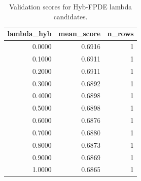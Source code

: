\begin{table}[t]
\caption{Validation scores for Hyb-FPDE lambda candidates.}
\label{tab:lambda_distribution_computed}
\centering
\begin{tabular}{rrr}
\toprule
lambda\_hyb & mean\_score & n\_rows \\
\midrule
0.0000 & 0.6916 & 1 \\
0.1000 & 0.6911 & 1 \\
0.2000 & 0.6911 & 1 \\
0.3000 & 0.6892 & 1 \\
0.4000 & 0.6898 & 1 \\
0.5000 & 0.6898 & 1 \\
0.6000 & 0.6876 & 1 \\
0.7000 & 0.6880 & 1 \\
0.8000 & 0.6873 & 1 \\
0.9000 & 0.6869 & 1 \\
1.0000 & 0.6865 & 1 \\
\bottomrule
\end{tabular}

\end{table}
